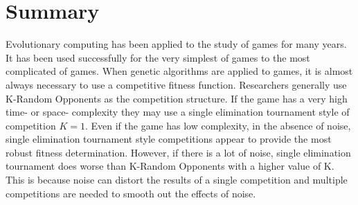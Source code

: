 \section{Summary}

Evolutionary computing has been applied to the study of games for many years. It
has been used successfully for the very simplest of games to the most
complicated of games. When genetic algorithms are applied to games, it is almost
always necessary to use a competitive fitness function. Researchers generally
use K-Random Opponents as the competition structure. If the game has a very high
time- or space- complexity they may use a single elimination tournament style of
competition \(K=1\). Even if the game has low complexity, in the absence of
noise, single elimination tournament style competitions appear to provide the
most robust fitness determination. However, if there is a lot of noise, single
elimination tournament does worse than K-Random Opponents with a higher value of
K. This is because noise can distort the results of a single competition and
multiple competitions are needed to smooth out the effects of noise.